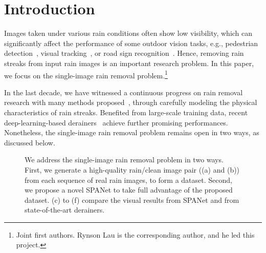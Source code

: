 \documentclass[10pt,twocolumn,letterpaper]{article}
\begin{document}
\section{Introduction}
Images taken under various rain conditions often show low visibility, which can significantly affect the performance of some outdoor vision tasks, e.g., pedestrian detection~\cite{mao:cvpr:2017:pd}, visual tracking~\cite{song:cvpr:2018:vital}, or road sign recognition~\cite{zhu:cvpr:2016:tsd}. Hence, removing rain streaks from input rain images is an important research problem. In this paper, we focus on the single-image rain removal problem.{\let\thefootnote\relax\footnote{{ Joint first authors.  Rynson Lau is the corresponding author, and he led this project.}}}


In the last decade, we have witnessed a continuous progress on rain removal research with many methods proposed~\cite{kang:tip:2012:imgdecomp,luo:iccv:2015:dsc,li:cvpr:2016:lp,chang:iccv:2017:lpnr,zhu:iccv:2017:jbo,du:pr:2018:grad}, through carefully modeling the physical characteristics of rain streaks. Benefited from large-scale training data, recent deep-learning-based derainers~\cite{fu:tip:2016:clearing,fu:cvpe:2017:ddn,yang:cvpr:2017:j,zhang:cvpr:2018:did,li:eccv:2018:rsecan,fan:acmmm:2018:rgffn,li:acmmm:2018:nled} achieve further promising performances. Nonetheless, the single-image rain removal problem remains open in two ways, as discussed below.

\begin{figure}[t]
\centering
\centering
{}
\centering
\vspace{-0.1in}
\centering
{}
\centering
{}
\centering
{}
\centering
\caption{We address the single-image rain removal problem in two ways. First, we generate a high-quality rain/clean image pair ((a) and (b)) from each sequence of real rain images, to form a dataset. Second, we propose a novel SPANet to take full advantage of the proposed dataset. (c) to (f) compare the visual results from SPANet and from state-of-the-art derainers.}
\vspace{-5mm}
\label{fig:first}
\end{figure}
\end{document}
